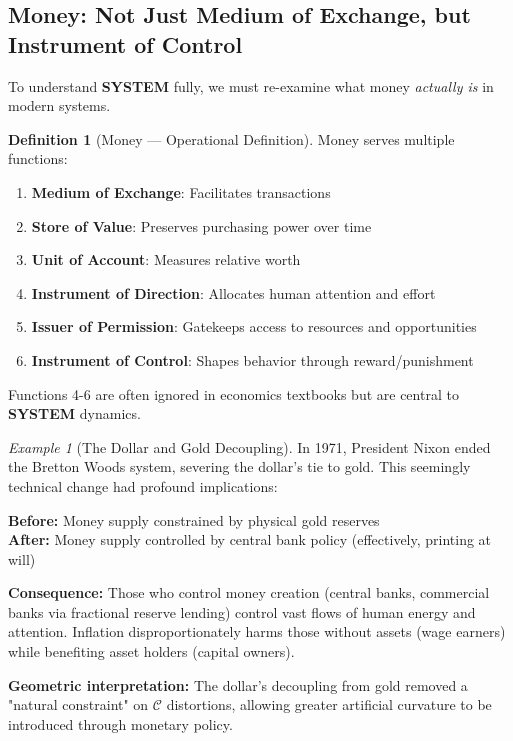\documentclass[11pt,a4paper]{article}
\newcommand{\SYSTEM}{\textbf{SYSTEM}}
\newcommand{\CC}{$\mathcal{C}$}
\theoremstyle{definition}
\newtheorem{definition}{Definition}[section]
\theoremstyle{remark}
\newtheorem{example}{Example}[section]
\begin{document}
\subsection{Money: Not Just Medium of Exchange, but Instrument of Control}

To understand \SYSTEM{} fully, we must re-examine what money \textit{actually is} in modern systems.

\begin{definition}[Money — Operational Definition]
\label{def:money}
Money serves multiple functions:
\begin{enumerate}
\item \textbf{Medium of Exchange}: Facilitates transactions
\item \textbf{Store of Value}: Preserves purchasing power over time
\item \textbf{Unit of Account}: Measures relative worth
\item \textbf{Instrument of Direction}: Allocates human attention and effort
\item \textbf{Issuer of Permission}: Gatekeeps access to resources and opportunities
\item \textbf{Instrument of Control}: Shapes behavior through reward/punishment
\end{enumerate}

Functions 4-6 are often ignored in economics textbooks but are central to \SYSTEM{} dynamics.
\end{definition}

\begin{example}[The Dollar and Gold Decoupling]
In 1971, President Nixon ended the Bretton Woods system, severing the dollar's tie to gold. This seemingly technical change had profound implications:

\textbf{Before:} Money supply constrained by physical gold reserves \\
\textbf{After:} Money supply controlled by central bank policy (effectively, printing at will)

\textbf{Consequence:} Those who control money creation (central banks, commercial banks via fractional reserve lending) control vast flows of human energy and attention. Inflation disproportionately harms those without assets (wage earners) while benefiting asset holders (capital owners).

\textbf{Geometric interpretation:} The dollar's decoupling from gold removed a "natural constraint" on \CC{} distortions, allowing greater artificial curvature to be introduced through monetary policy.
\end{example}
\end{document}
